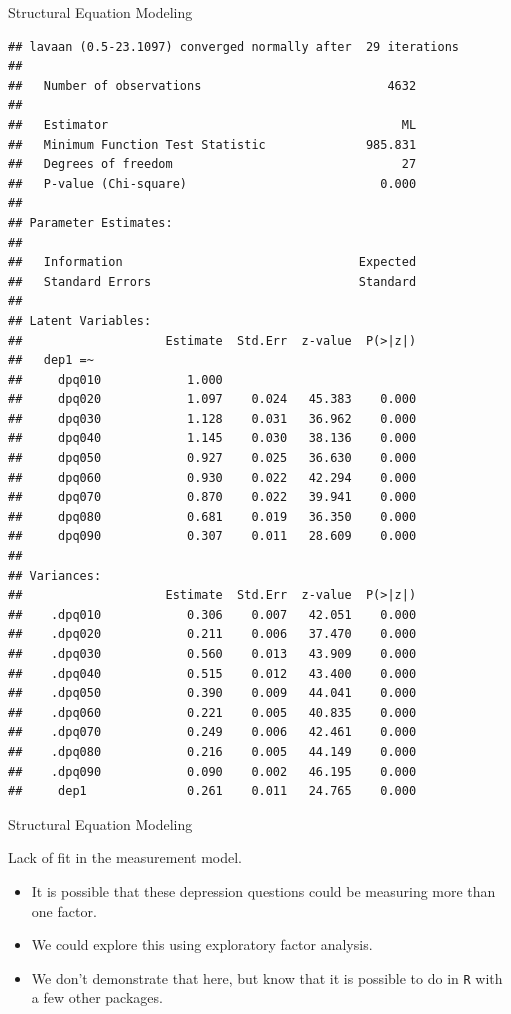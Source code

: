 \begin{frame}[fragile]{Structural Equation Modeling}

\tiny

\begin{verbatim}
## lavaan (0.5-23.1097) converged normally after  29 iterations
## 
##   Number of observations                          4632
## 
##   Estimator                                         ML
##   Minimum Function Test Statistic              985.831
##   Degrees of freedom                                27
##   P-value (Chi-square)                           0.000
## 
## Parameter Estimates:
## 
##   Information                                 Expected
##   Standard Errors                             Standard
## 
## Latent Variables:
##                    Estimate  Std.Err  z-value  P(>|z|)
##   dep1 =~                                             
##     dpq010            1.000                           
##     dpq020            1.097    0.024   45.383    0.000
##     dpq030            1.128    0.031   36.962    0.000
##     dpq040            1.145    0.030   38.136    0.000
##     dpq050            0.927    0.025   36.630    0.000
##     dpq060            0.930    0.022   42.294    0.000
##     dpq070            0.870    0.022   39.941    0.000
##     dpq080            0.681    0.019   36.350    0.000
##     dpq090            0.307    0.011   28.609    0.000
## 
## Variances:
##                    Estimate  Std.Err  z-value  P(>|z|)
##    .dpq010            0.306    0.007   42.051    0.000
##    .dpq020            0.211    0.006   37.470    0.000
##    .dpq030            0.560    0.013   43.909    0.000
##    .dpq040            0.515    0.012   43.400    0.000
##    .dpq050            0.390    0.009   44.041    0.000
##    .dpq060            0.221    0.005   40.835    0.000
##    .dpq070            0.249    0.006   42.461    0.000
##    .dpq080            0.216    0.005   44.149    0.000
##    .dpq090            0.090    0.002   46.195    0.000
##     dep1              0.261    0.011   24.765    0.000
\end{verbatim}

\end{frame}

\begin{frame}[fragile]{Structural Equation Modeling}

Lack of fit in the measurement model.

\begin{itemize}
\tightlist
\item
  It is possible that these depression questions could be measuring more
  than one factor.
\item
  We could explore this using exploratory factor analysis.
\item
  We don't demonstrate that here, but know that it is possible to do in
  \texttt{R} with a few other packages.
\end{itemize}

\end{frame}

